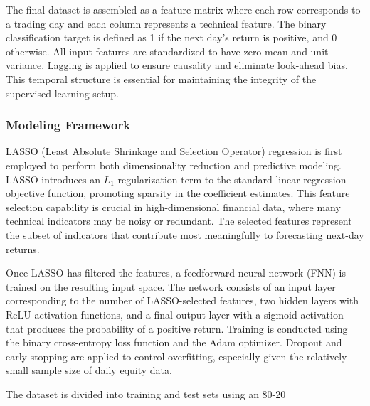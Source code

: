 The final dataset is assembled as a feature matrix where each row corresponds to a trading day and each column represents a technical feature. The binary classification target is defined as 1 if the next day’s return is positive, and 0 otherwise. All input features are standardized to have zero mean and unit variance. Lagging is applied to ensure causality and eliminate look-ahead bias. This temporal structure is essential for maintaining the integrity of the supervised learning setup.

\subsubsection{Modeling Framework}

LASSO (Least Absolute Shrinkage and Selection Operator) regression is first employed to perform both dimensionality reduction and predictive modeling. LASSO introduces an $L_1$ regularization term to the standard linear regression objective function, promoting sparsity in the coefficient estimates. This feature selection capability is crucial in high-dimensional financial data, where many technical indicators may be noisy or redundant. The selected features represent the subset of indicators that contribute most meaningfully to forecasting next-day returns.

Once LASSO has filtered the features, a feedforward neural network (FNN) is trained on the resulting input space. The network consists of an input layer corresponding to the number of LASSO-selected features, two hidden layers with ReLU activation functions, and a final output layer with a sigmoid activation that produces the probability of a positive return. Training is conducted using the binary cross-entropy loss function and the Adam optimizer. Dropout and early stopping are applied to control overfitting, especially given the relatively small sample size of daily equity data.

The dataset is divided into training and test sets using an 80-20

